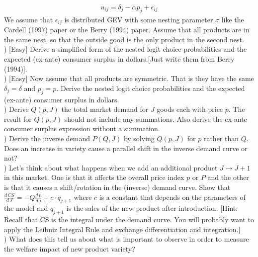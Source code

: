 \documentclass[12pt]{article}
\begin{document}
\begin{eqnarray*}
u_{ij} = \delta_j - \alpha p_j + \epsilon_{ij}
\end{eqnarray*}
We assume that $\epsilon_{ij}$ is distributed GEV with some nesting parameter $\sigma$ like the Cardell (1997) paper or the Berry (1994) paper. Assume that all products are in the same nest, so that the outside good is the only product in the second nest.\\

) [Easy] Derive a simplified form of the nested logit choice probabilities and the expected (ex-ante) consumer surplus in dollars.[Just write them from Berry (1994)].\\

) [Easy] Now assume that all products are symmetric. That is they have the same $\delta_j = \delta$ and $p_j = p$. Derive the nested logit choice probabilities and the expected (ex-ante) consumer surplus in dollars. \\

) Derive $Q(p,J)$ the total market demand for $J$ goods each with price $p$. The result for $Q(p,J)$ should not include any summations. Also derive the ex-ante consumer surplus expression without a summation.\\

) Derive the inverse demand $P(Q,J)$ by solving $Q(p,J)$ for $p$ rather than $Q$. Does an increase in variety cause a parallel shift in the inverse demand curve or not?\\

) Let's think about what happens when we add an additional product $J \rightarrow J+1$ in this market. One is that it affects the overall price index $p$ or $P$ and the other is that it causes a shift/rotation in the (inverse) demand curve. Show that $\frac{d\, CS}{d\, J} = -Q \frac{d\, p}{d\, j} +  c \cdot q_{j+1}$ where $c$ is a constant that depends on the parameters of the model and $q_{j+1}$ is the sales of the new product after introduction. [Hint: Recall that CS is the integral under the demand curve. You will probably want to apply the Leibniz Integral Rule and exchange differentiation and integration.]\\


) What does this tell us about what is important to observe in order to measure the welfare impact of new product variety?
\end{document}

